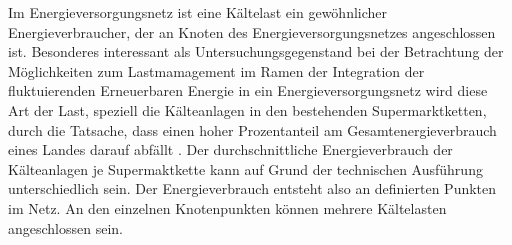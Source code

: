 
Im Energieversorgungsnetz ist eine Kältelast ein gewöhnlicher Energieverbraucher, der an Knoten des Energieversorgungsnetzes
angeschlossen ist. Besonderes interessant als Untersuchungsgegenstand bei der Betrachtung der Möglichkeiten zum Lastmamagement
im Ramen der Integration der fluktuierenden Erneuerbaren Energie in ein Energieversorgungsnetz wird diese Art der Last,
speziell die Kälteanlagen in den bestehenden Supermarktketten, durch die Tatsache, dass einen hoher Prozentanteil am
Gesamtenergieverbrauch eines Landes darauf abfällt \cite{doctor}. Der durchschnittliche Energieverbrauch der Kälteanlagen je
Supermaktkette kann auf Grund der technischen Ausführung unterschiedlich sein. Der Energieverbrauch entsteht also an
definierten Punkten im Netz. An den einzelnen Knotenpunkten können mehrere Kältelasten angeschlossen sein. 
